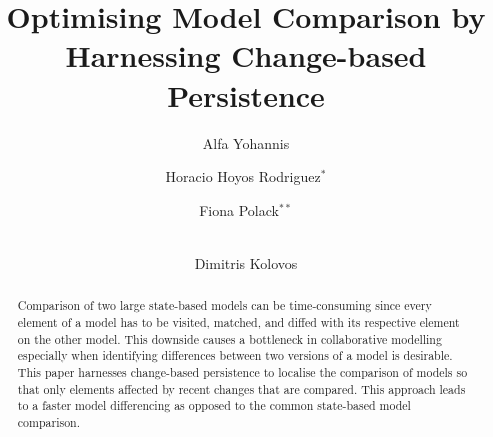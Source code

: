 \documentclass{llncs}
\begin{document}
\renewcommand{\thelstlisting}{\arabic{lstlisting}}
\renewcommand{\labelitemi}{$\bullet$}
\newcommand{\dk}[1]{\textbf{[DK: #1]}}

\title{Optimising Model Comparison by Harnessing Change-based Persistence}
%
%
\author{
Alfa Yohannis \and Horacio Hoyos Rodriguez$^{*}$ \and Fiona Polack$^{**}$ \and \\ Dimitris Kolovos
}

%
%



\maketitle      %

\begin{abstract}
Comparison of two large state-based models can be time-consuming since every element of a model has to be visited, matched, and diffed with its respective element on the other model. This downside causes a bottleneck in collaborative modelling especially when identifying differences between two versions of a model is desirable. This paper harnesses change-based persistence to localise the comparison of models so that only elements affected by recent changes that are compared. This approach leads to a faster model differencing as opposed to the common state-based model comparison. 
\end{abstract}
\end{document}
